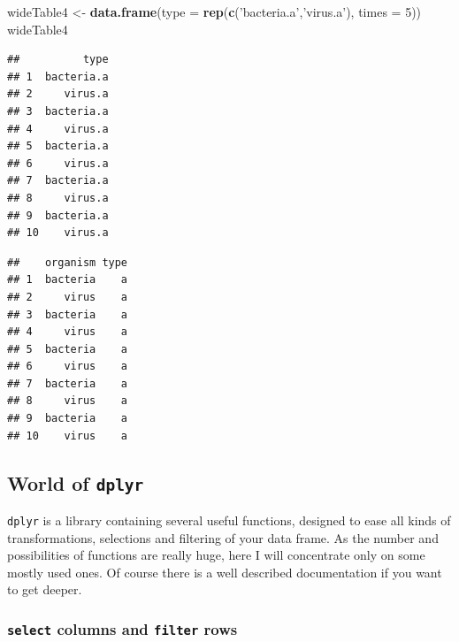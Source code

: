 \documentclass[]{book}
\newenvironment{Shaded}{\begin{snugshade}}{\end{snugshade}}
\newcommand{\KeywordTok}[1]{\textcolor[rgb]{0.12,0.11,0.11}{\textbf{#1}}}
\newcommand{\DataTypeTok}[1]{\textcolor[rgb]{0.00,0.34,0.68}{#1}}
\newcommand{\DecValTok}[1]{\textcolor[rgb]{0.69,0.50,0.00}{#1}}
\newcommand{\CharTok}[1]{\textcolor[rgb]{0.57,0.30,0.62}{#1}}
\newcommand{\StringTok}[1]{\textcolor[rgb]{0.75,0.01,0.01}{#1}}
\newcommand{\OperatorTok}[1]{\textcolor[rgb]{0.12,0.11,0.11}{#1}}
\newcommand{\NormalTok}[1]{\textcolor[rgb]{0.12,0.11,0.11}{#1}}
\theoremstyle{definition}
\theoremstyle{definition}
\theoremstyle{definition}
\theoremstyle{remark}
\begin{document}
\begin{Shaded}
\begin{Highlighting}[]
\NormalTok{wideTable4 <-}\StringTok{ }\KeywordTok{data.frame}\NormalTok{(}\DataTypeTok{type =} \KeywordTok{rep}\NormalTok{(}\KeywordTok{c}\NormalTok{(}\StringTok{'bacteria.a'}\NormalTok{,}\StringTok{'virus.a'}\NormalTok{), }\DataTypeTok{times =} \DecValTok{5}\NormalTok{))}
\NormalTok{wideTable4}
\end{Highlighting}
\end{Shaded}

\begin{verbatim}
##          type
## 1  bacteria.a
## 2     virus.a
## 3  bacteria.a
## 4     virus.a
## 5  bacteria.a
## 6     virus.a
## 7  bacteria.a
## 8     virus.a
## 9  bacteria.a
## 10    virus.a
\end{verbatim}

\begin{Shaded}
\end{Shaded}

\begin{verbatim}
##    organism type
## 1  bacteria    a
## 2     virus    a
## 3  bacteria    a
## 4     virus    a
## 5  bacteria    a
## 6     virus    a
## 7  bacteria    a
## 8     virus    a
## 9  bacteria    a
## 10    virus    a
\end{verbatim}

\subsection{\texorpdfstring{World of
\texttt{dplyr}}{World of dplyr}}\label{world-of-dplyr}

\texttt{dplyr} is a library containing several useful functions,
designed to ease all kinds of transformations, selections and filtering
of your data frame. As the number and possibilities of functions are
really huge, here I will concentrate only on some mostly used ones. Of
course there is a well described documentation if you want to get
deeper.

\subsubsection{\texorpdfstring{\texttt{select} columns and
\texttt{filter}
rows}{select columns and filter rows}}\label{select-columns-and-filter-rows}
\end{document}
